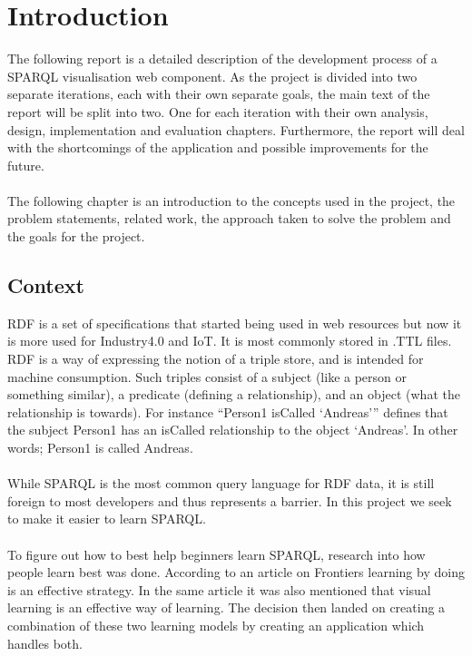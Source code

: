 \chapter{Introduction}
\label{chap:introduction}

The following report is a detailed description of the development process of a SPARQL visualisation web component. As the project is divided into two separate iterations, each with their own separate goals, the main text of the report will be split into two. One for each iteration with their own analysis, design, implementation and evaluation chapters. Furthermore, the report will deal with the shortcomings of the application and possible improvements for the future. \\\\
The following chapter is an introduction to the concepts used in the project, the problem statements, related work, the approach taken to solve the problem and the goals for the project.


\section{Context}
RDF is a set of specifications that started being used in web resources\cite{W3SchoolsXMLRDF} but now it is more used for Industry4.0 and IoT. It is most commonly stored in .TTL files. RDF is a way of expressing the notion of a triple store, and is intended for machine consumption. Such triples consist of a subject (like a person or something similar), a predicate (defining a relationship), and an object (what the relationship is towards). For instance “Person1 isCalled ‘Andreas’” defines that the subject Person1 has an isCalled relationship to the object ‘Andreas’. In other words; Person1 is called Andreas.
\\\\
While SPARQL is the most common query language for RDF data, it is still foreign to most developers and thus represents a barrier. In this project we seek to make it easier to learn SPARQL.
\\\\
To figure out how to best help beginners learn SPARQL, research into how people learn best was done. According to an article on Frontiers\cite{frontiers} learning by doing is an effective strategy. In the same article it was also mentioned that visual learning is an effective way of learning. The decision then landed on creating a combination of these two learning models by creating an application which handles both.
